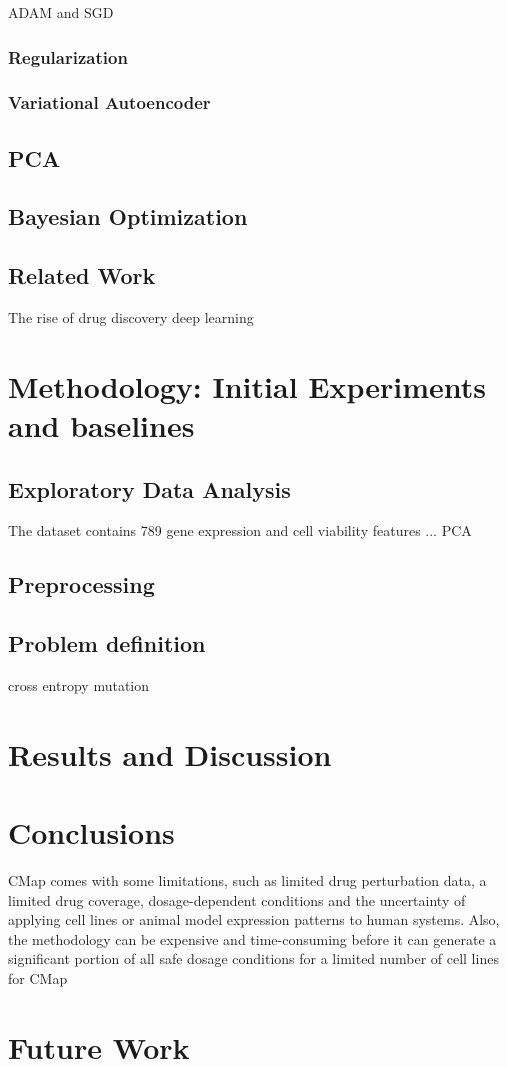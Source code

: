 \documentclass[bsc,frontabs,twoside,singlespacing,parskip,deptreport]{infthesis}     %
\begin{document}
ADAM and SGD

\subsection{Regularization}

\subsection{Variational Autoencoder}

\section{PCA}
\section{Bayesian Optimization}

\section{Related Work}
The rise of drug discovery deep learning
\chapter{Methodology: Initial Experiments and baselines}
\section{Exploratory Data Analysis}
The dataset contains 789 gene expression and cell viability features ...
PCA
\section{Preprocessing}
\section{Problem definition}

cross entropy
mutation
\chapter{Results and Discussion}
\chapter{Conclusions}
CMap comes with some limitations, such as limited drug perturbation data, a limited drug coverage, dosage-dependent conditions and the uncertainty of applying cell lines or animal model expression patterns to human systems. Also, the methodology can be expensive and time-consuming before it can generate a significant portion of all safe dosage conditions for a limited number of cell lines for CMap
\chapter{Future Work}



\end{document}

